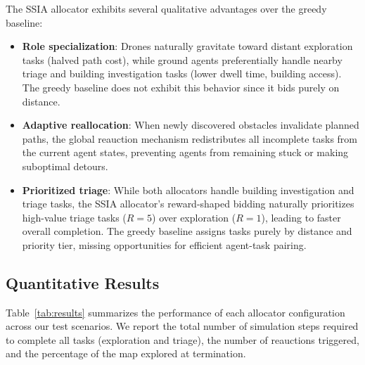 \documentclass[conference]{IEEEtran}
\begin{document}
The SSIA allocator exhibits several qualitative advantages over the greedy baseline:
\begin{itemize}
    \item \textbf{Role specialization}: Drones naturally gravitate toward distant exploration tasks (halved path cost), while ground agents preferentially handle nearby triage and building investigation tasks (lower dwell time, building access). The greedy baseline does not exhibit this behavior since it bids purely on distance.
    \item \textbf{Adaptive reallocation}: When newly discovered obstacles invalidate planned paths, the global reauction mechanism redistributes all incomplete tasks from the current agent states, preventing agents from remaining stuck or making suboptimal detours.
    \item \textbf{Prioritized triage}: While both allocators handle building investigation and triage tasks, the SSIA allocator's reward-shaped bidding naturally prioritizes high-value triage tasks ($R=5$) over exploration ($R=1$), leading to faster overall completion. The greedy baseline assigns tasks purely by distance and priority tier, missing opportunities for efficient agent-task pairing.
\end{itemize}

\subsection{Quantitative Results}

Table~\ref{tab:results} summarizes the performance of each allocator configuration across our test scenarios. We report the total number of simulation steps required to complete all tasks (exploration and triage), the number of reauctions triggered, and the percentage of the map explored at termination.
\end{document}
